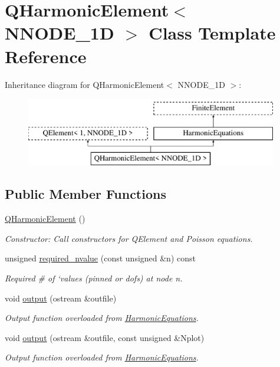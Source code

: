 \hypertarget{classQHarmonicElement}{}\section{Q\+Harmonic\+Element$<$ N\+N\+O\+D\+E\+\_\+1D $>$ Class Template Reference}
\label{classQHarmonicElement}
Inheritance diagram for Q\+Harmonic\+Element$<$ N\+N\+O\+D\+E\+\_\+1D $>$\+:\begin{figure}[H]
\begin{center}
\leavevmode
\includegraphics[height=3.000000cm]{classQHarmonicElement}
\end{center}
\end{figure}
\subsection*{Public Member Functions}
\begin{DoxyCompactItemize}
\item 
\hyperlink{classQHarmonicElement_a0e7480a0064b51e87ba197551bb10373}{Q\+Harmonic\+Element} ()
\begin{DoxyCompactList}\small\item\em Constructor\+: Call constructors for Q\+Element and Poisson equations. \end{DoxyCompactList}\item 
unsigned \hyperlink{classQHarmonicElement_a8574a452983b15fb2b4d40ec4ef3e890}{required\+\_\+nvalue} (const unsigned \&n) const
\begin{DoxyCompactList}\small\item\em Required \# of `values\textquotesingle{} (pinned or dofs) at node n. \end{DoxyCompactList}\item 
void \hyperlink{classQHarmonicElement_a8b38012f3d62ef419c359f5e545e5f85}{output} (ostream \&outfile)
\begin{DoxyCompactList}\small\item\em Output function overloaded from \hyperlink{classHarmonicEquations}{Harmonic\+Equations}. \end{DoxyCompactList}\item 
void \hyperlink{classQHarmonicElement_a25cda8268943ebba984da16b07544e89}{output} (ostream \&outfile, const unsigned \&Nplot)
\begin{DoxyCompactList}\small\item\em Output function overloaded from \hyperlink{classHarmonicEquations}{Harmonic\+Equations}. \end{DoxyCompactList}\end{DoxyCompactItemize}
